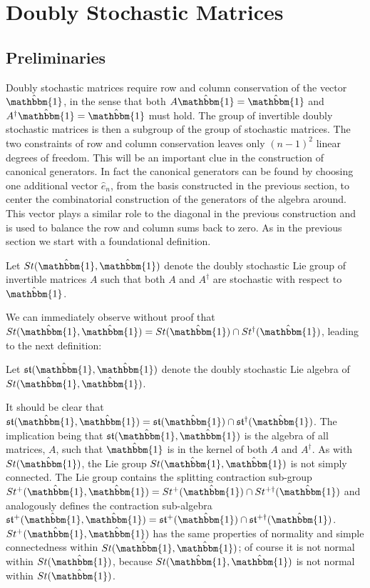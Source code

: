 \section{Doubly Stochastic Matrices}
\subsection{Preliminaries}
Doubly stochastic matrices require row and column conservation of the vector $\hat{\mathbbm{1}}$, 
in the sense that both $A \hat{\mathbbm{1}} = \hat{\mathbbm{1}}$ and $A^\dagger \hat{\mathbbm{1}} = \hat{\mathbbm{1}}$ 
must hold. The group of invertible doubly stochastic matrices is then a subgroup of the
group of stochastic matrices. The two constraints of row and column conservation leaves only
$\left(n - 1\right)^2$ linear degrees of freedom. This will be an important clue in the
construction of canonical generators. In fact the canonical generators can be found by
choosing one additional vector $\hat{e}_n$, from the basis constructed in the previous
section, to center the combinatorial construction of the generators of the algebra around.
This vector plays a similar role to the diagonal in the previous construction and is used to
balance the row and column sums back to zero. As in the previous section we start with a 
foundational definition.
\begin{definition}
	Let $St(\hat{\mathbbm{1}}, \hat{\mathbbm{1}})$ denote the doubly stochastic 
	Lie group of invertible matrices $A$ such that both $A$ and $A^\dagger$ are 
	stochastic with respect to $\hat{\mathbbm{1}}$.
\end{definition}
We can immediately observe without proof that $St(\hat{\mathbbm{1}}, \hat{\mathbbm{1}}) = St(\hat{\mathbbm{1}}) \cap St^\dagger(\hat{\mathbbm{1}})$,
leading to the next definition:
\begin{definition}
	Let $\mathfrak{st}(\hat{\mathbbm{1}}, \hat{\mathbbm{1}})$ denote the doubly 
	stochastic Lie algebra of $St(\hat{\mathbbm{1}},\hat{\mathbbm{1}})$.
\end{definition}
It should be clear that $\mathfrak{st}(\hat{\mathbbm{1}}, \hat{\mathbbm{1}}) = \mathfrak{st}(\hat{\mathbbm{1}}) \cap \mathfrak{st}^\dagger(\hat{\mathbbm{1}})$.
The implication being that $\mathfrak{st}(\hat{\mathbbm{1}}, \hat{\mathbbm{1}})$ is the
algebra of all matrices, $A$, such that $\hat{\mathbbm{1}}$ is in the kernel of both $A$ and $A^\dagger$.
As with $St(\hat{\mathbbm{1}})$, the Lie group $St(\hat{\mathbbm{1}}, \hat{\mathbbm{1}})$ is
not simply connected. The Lie group contains the splitting contraction sub-group $St^{+}(\hat{\mathbbm{1}}, \hat{\mathbbm{1}}) = St^{+}(\hat{\mathbbm{1}}) \cap St^{+\dagger}(\hat{\mathbbm{1}})$
and analogously defines the contraction sub-algebra $\mathfrak{st}^{+}(\hat{\mathbbm{1}}, \hat{\mathbbm{1}}) = \mathfrak{st}^{+}(\hat{\mathbbm{1}}) \cap \mathfrak{st}^{+\dagger}(\hat{\mathbbm{1}})$. 
$St^{+}(\hat{\mathbbm{1}}, \hat{\mathbbm{1}})$ has the same properties of normality and 
simple connectedness within $St(\hat{\mathbbm{1}}, \hat{\mathbbm{1}})$; of course it is not
normal within $St(\hat{\mathbbm{1}})$, because $St(\hat{\mathbbm{1}}, \hat{\mathbbm{1}})$ is
not normal within $St(\hat{\mathbbm{1}})$.
